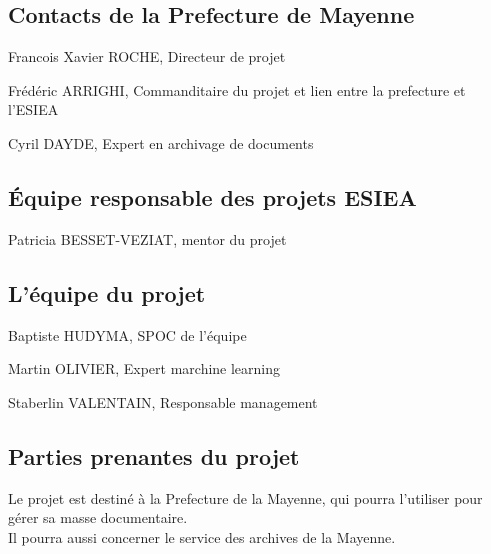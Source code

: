 
\subsection {Contacts de la Prefecture de Mayenne}
Francois Xavier ROCHE, Directeur de projet \\
\par
Frédéric ARRIGHI, Commanditaire du projet et lien entre la prefecture et l'ESIEA \\
\par
Cyril DAYDE, Expert en archivage de documents \\



\subsection {Équipe responsable des projets ESIEA}
Patricia BESSET-VEZIAT, mentor du projet \\



\subsection {L'équipe du projet}
Baptiste HUDYMA, SPOC de l'équipe \\
\par
Martin OLIVIER, Expert marchine learning \\
\par
Staberlin VALENTAIN, Responsable management \\


\subsection {Parties prenantes du projet}
Le projet est destiné à la Prefecture de la Mayenne, qui pourra l'utiliser pour gérer sa masse documentaire. \\
Il pourra aussi concerner le service des archives de la Mayenne. \\

